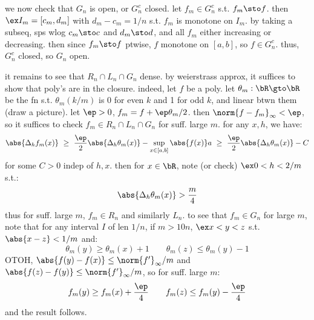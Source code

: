 
we now check that $G_{n}$ is open, or $G_{n}^{c}$ closed.
let $f_{m}\in G_{n}^{c}$ s.t. $f_{m}\sto f$.
then $\ex I_{m}=[c_{m},d_{m}]$ with $d_{m}-c_{m}=1/n$ s.t. $f_{m}$ is monotone
on $I_{m}$.
by taking a subseq, sps wlog $c_{m}\sto c$ and $d_{m}\sto d$, and all
$f_{m}$ either increasing or decreasing.
then since $f_{m}\sto f$ ptwise, $f$ monotone on $[a,b]$, so $f\in G_{n}^{c}$.
thus, $G_{n}^{c}$ closed, so $G_{n}$ open.

it remains to see that $R_{n}\cap L_{n}\cap G_{n}$ dense.
by weierstrass approx, it suffices to show that poly's are in the closure.
indeed, let $f$ be a poly.
let $\theta_{m}:\bR\gto\bR$ be the fn s.t. $\theta_{m}(k/m)$ is 0 for even $k$ and 1 for odd $k$,
and linear btwn them (draw a picture).
let $\ep>0$, $f_{m}=f+\ep\theta_{m}/2$.
then $\norm{f-f_{m}}_{\infty}<\ep$, so it suffices to check $f_{m}\in R_{n}\cap L_{n}\cap G_{n}$
for suff. large $m$. for any $x,h$, we have:
\begin{equation*}
	\abs{\Delta_{h}f_{m}(x)}
	\ \geq \ \frac{\ep}{2}\abs{\Delta_{h}\theta_{m}(x)} - \sup_{x\in[a,b]}\abs{f(x)}a
	\ \geq \ \frac{\ep}{2}\abs{\Delta_{h}\theta_{m}(x)}-C
\end{equation*}
for some $C>0$ indep of $h,x$.
then for $x\in\bR$, note (or check) $\ex0<h<2/m$ s.t.:
\begin{equation*}
	\abs{\Delta_{h}\theta_{m}(x)}>\frac{m}{4}
\end{equation*}
thus for suff. large $m$, $f_{m}\in R_{n}$ and similarly $L_{n}$.
to see that $f_{m}\in G_{n}$ for large $m$, note that for any interval $I$ of len $1/n$,
if $m>10n$, $\ex x<y<z$ s.t. $\abs{x-z}<1/m$ and:
\begin{equation*}
	\theta_{m}(y)\geq\theta_{m}(x)+1 \qquad \theta_{m}(z)\leq\theta_{m}(y)-1
\end{equation*}
OTOH, $\abs{f(y)-f(x)}\leq\norm{f'}_{\infty}/m$ and $\abs{f(z)-f(y)}\leq\norm{f'}_{\infty}/m$,
so for suff. large $m$:
\begin{equation*}
	f_{m}(y)\geq f_{m}(x)+\frac{\ep}{4} \qquad f_{m}(z)\leq f_{m}(y)-\frac{\ep}{4}
\end{equation*}
and the result follows.
